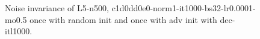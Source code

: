 \begin{figure}[!ht]
  \centering
  \caption{Noise invariance of L5-n500, c1d0dd0e0-norm1-it1000-bs32-lr0.0001-mo0.5 once with random init and once with adv init with dec-itl1000.}
  \label{fig:ml_test_bench_noise_fc3}
\end{figure}
\FloatBarrier
\noindent